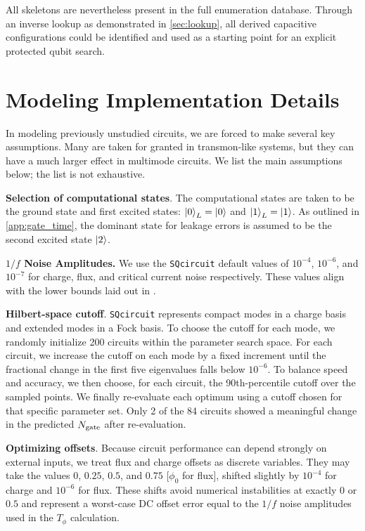 All skeletons are nevertheless present in the full enumeration database. Through an inverse lookup as demonstrated in \cref{sec:lookup}, all derived capacitive configurations could be identified and used as a starting point for an explicit protected qubit search.






\section{Modeling Implementation Details}\label{app:details}
In modeling previously unstudied circuits, we are forced to make several key assumptions. Many are taken for granted in transmon-like systems, but they can have a much larger effect in multimode circuits. We list the main assumptions below; the list is not exhaustive.

\textbf{Selection of computational states}. The computational states are taken to be the ground state and first excited states: $\ket{0}_L = \ket{0}$ and $\ket{1}_L = \ket{1}$. As outlined in \cref{app:gate_time}, the dominant state for leakage errors is assumed to be the second excited state $\ket{2}$.

\textbf{$1/f$ Noise Amplitudes.} We use the \verb|SQcircuit| default values of $10^{-4}$, $10^{-6}$, and $10^{-7}$ for charge, flux, and critical current noise respectively. These values align with the lower bounds laid out in \cite{houck_life_2009}.

\textbf{Hilbert-space cutoff}. \verb|SQcircuit| represents compact modes in a charge basis and extended modes in a Fock basis. To choose the cutoff for each mode, we randomly initialize 200 circuits within the parameter search space. For each circuit, we increase the cutoff on each mode by a fixed increment until the fractional change in the first five eigenvalues falls below $10^{-6}$. To balance speed and accuracy, we then choose, for each circuit, the 90th-percentile cutoff over the sampled points. We finally re-evaluate each optimum using a cutoff chosen for that specific parameter set. Only 2 of the 84 circuits showed a meaningful change in the predicted  $N_{\rm gate}$ after re-evaluation.


\textbf{Optimizing offsets}. Because circuit performance can depend strongly on external inputs, we treat flux and charge offsets as discrete variables. They may take the values $0$, $0.25$, $0.5$, and $0.75$ [$\phi_0$ for flux], shifted slightly by $10^{-4}$ for charge and $10^{-6}$ for flux. These shifts avoid numerical instabilities at exactly $0$ or $0.5$ and represent a worst-case DC offset error equal to the $1/f$ noise amplitudes used in the $T_\phi$ calculation.


